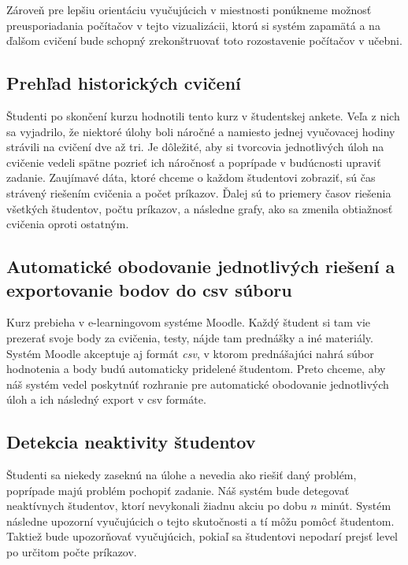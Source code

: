 Zároveň pre lepšiu orientáciu vyučujúcich v miestnosti ponúkneme možnosť
preusporiadania počítačov v tejto vizualizácii, ktorú si systém zapamätá a
na ďalšom cvičení bude schopný zrekonštruovať toto rozostavenie počítačov v učebni.

\subsection{Prehľad historických cvičení}
\label{sec:apprequirements:overview}

Študenti po skončení kurzu hodnotili tento kurz v študentskej ankete. Veľa z nich
sa vyjadrilo, že niektoré úlohy boli náročné a namiesto jednej vyučovacej hodiny
strávili na cvičení dve až tri.
Je dôležité, aby si tvorcovia jednotlivých úloh na cvičenie vedeli spätne pozrieť
ich náročnosť a poprípade v budúcnosti upraviť zadanie.
Zaujímavé dáta, ktoré chceme o každom študentovi zobraziť, sú čas strávený riešením cvičenia a počet príkazov. Ďalej sú to priemery časov riešenia všetkých študentov,
počtu príkazov, a následne grafy, ako sa zmenila obtiažnosť cvičenia oproti ostatným.%


\subsection{Automatické obodovanie jednotlivých riešení a exportovanie bodov do csv súboru}
\label{sec:apprequirements:export}

Kurz prebieha v e-learningovom systéme Moodle. Každý študent si tam vie prezerať
svoje body za cvičenia, testy, nájde tam prednášky a iné materiály. Systém Moodle akceptuje aj formát
\textit{csv}, v ktorom prednášajúci nahrá súbor hodnotenia a body budú automaticky pridelené
študentom. Preto chceme, aby náš systém vedel poskytnúť rozhranie pre automatické
obodovanie jednotlivých úloh a ich následný export v csv formáte.

\subsection{Detekcia neaktivity študentov}
\label{sec:apprequirements:noactivity}

Študenti sa niekedy zaseknú na úlohe a nevedia ako riešiť daný problém, poprípade
majú problém pochopiť zadanie. Náš systém bude detegovať neaktívnych študentov, ktorí
nevykonali žiadnu akciu po dobu $n$ minút. Systém následne upozorní vyučujúcich o tejto
skutočnosti a tí môžu pomôcť študentom.
Taktiež bude upozorňovať vyučujúcich, pokiaľ sa študentovi nepodarí prejsť level
po určitom počte príkazov.

